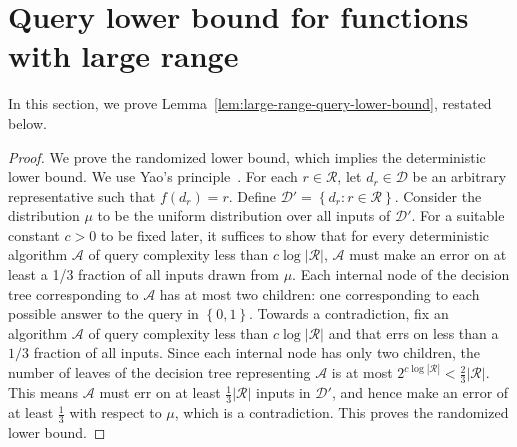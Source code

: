\documentclass[11pt]{article}
\newcommand{\cA}{\mathcal{A}}
\newcommand{\cD}{\mathcal{D}}
\newcommand{\cR}{\mathcal{R}}
\newcommand{\set}[1]{\left\{ #1 \right\}}
\newcommand{\cbra}[1]{\left\{#1\right\}}
\newcommand{\zone}{\set{0,1}}
\begin{document}


\appendix

\section{Query lower bound for functions with large range}

In this section, we prove Lemma~\ref{lem:large-range-query-lower-bound}, restated below.
\countingLowerBound*
\begin{proof}  
    We prove the randomized lower bound, which implies the deterministic lower bound. We use Yao's principle~\cite{Yao77}. For each $r \in \cR$, let $d_r \in \cD$ be an arbitrary representative such that $f(d_r) = r$. Define $\cD' = \cbra{d_r : r \in \cR}$. Consider the distribution $\mu$ to be the uniform distribution over all inputs of $\cD'$. For a suitable constant $c > 0$ to be fixed later, it suffices to show that for every deterministic algorithm $\cA$ of query complexity less than $c\log|\cR|$, $\cA$ must make an error on at least a 1/3 fraction of all inputs drawn from $\mu$. Each internal node of the decision tree corresponding to $\cA$ has at most two children: one corresponding to each possible answer to the query in $\zone$. Towards a contradiction, fix an algorithm $\cA$ of query complexity less than $c\log|\cR|$ and that errs on less than a $1/3$ fraction of all inputs. Since each internal node has only two children, the number of leaves of the decision tree representing $\cA$ is at most $2^{c\log|\cR|} < \frac{2}{3}|\cR|$. This means $\cA$ must err on at least $\frac13 |\cR|$ inputs in $\cD'$, and hence make an error of at least $\frac13$ with respect to $\mu$, which is a contradiction. This proves the randomized lower bound.
\end{proof}
\end{document}
